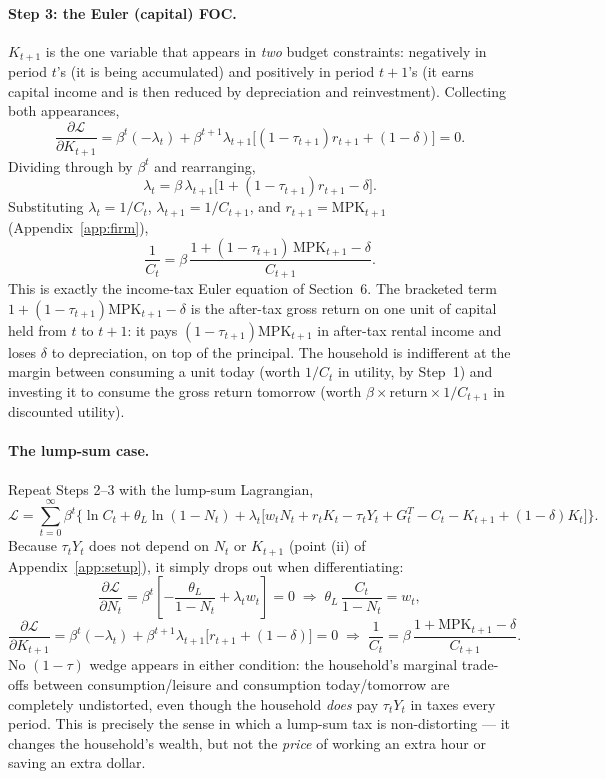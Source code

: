 \documentclass[11pt]{article}
\newcommand{\eq}[1]{\begin{equation}#1\end{equation}}
\begin{document}
\paragraph{Step 3: the Euler (capital) FOC.} $K_{t+1}$ is the one variable
that appears in \emph{two} budget constraints: negatively in period $t$'s
(it is being accumulated) and positively in period $t+1$'s (it earns
capital income and is then reduced by depreciation and reinvestment).
Collecting both appearances,
\eq{
\frac{\partial\mathcal{L}}{\partial K_{t+1}}
= \beta^t(-\lambda_t) + \beta^{t+1}\lambda_{t+1}\Big[(1-\tau_{t+1})r_{t+1}+(1-\delta)\Big] = 0.
}
Dividing through by $\beta^t$ and rearranging,
\eq{ \lambda_t = \beta\,\lambda_{t+1}\Big[1+(1-\tau_{t+1})r_{t+1}-\delta\Big]. }
Substituting $\lambda_t=1/C_t$, $\lambda_{t+1}=1/C_{t+1}$, and
$r_{t+1}=\mathrm{MPK}_{t+1}$ (Appendix~\ref{app:firm}),
\eq{ \boxed{\frac{1}{C_t} = \beta\,\frac{1+(1-\tau_{t+1})\,\mathrm{MPK}_{t+1}-\delta}{C_{t+1}}.} }
This is exactly the income-tax Euler equation of Section~6. The
bracketed term $1+(1-\tau_{t+1})\mathrm{MPK}_{t+1}-\delta$ is the
after-tax gross return on one unit of capital held from $t$ to $t+1$: it
pays $(1-\tau_{t+1})\mathrm{MPK}_{t+1}$ in after-tax rental income and
loses $\delta$ to depreciation, on top of the principal. The household is
indifferent at the margin between consuming a unit today (worth $1/C_t$ in
utility, by Step~1) and investing it to consume the gross return tomorrow
(worth $\beta\times\text{return}\times 1/C_{t+1}$ in discounted utility).

\paragraph{The lump-sum case.} Repeat Steps 2--3 with the lump-sum
Lagrangian,
\eq{
\mathcal{L} = \sum_{t=0}^{\infty}\beta^t\Big\{
  \ln C_t + \theta_L\ln(1-N_t)
  + \lambda_t\Big[w_tN_t+r_tK_t-\tau_tY_t+G^T_t-C_t-K_{t+1}+(1-\delta)K_t\Big]
\Big\}.
}
Because $\tau_tY_t$ does not depend on $N_t$ or $K_{t+1}$ (point (ii) of
Appendix~\ref{app:setup}), it simply drops out when differentiating:
\eq{
\frac{\partial\mathcal{L}}{\partial N_t}=\beta^t\left[-\frac{\theta_L}{1-N_t}+\lambda_tw_t\right]=0
\;\Longrightarrow\; \boxed{\theta_L\,\frac{C_t}{1-N_t}=w_t,}
}
\eq{
\frac{\partial\mathcal{L}}{\partial K_{t+1}}=\beta^t(-\lambda_t)+\beta^{t+1}\lambda_{t+1}\big[r_{t+1}+(1-\delta)\big]=0
\;\Longrightarrow\; \boxed{\frac{1}{C_t}=\beta\,\frac{1+\mathrm{MPK}_{t+1}-\delta}{C_{t+1}}.}
}
No $(1-\tau)$ wedge appears in either condition: the household's marginal
trade-offs between consumption/leisure and consumption today/tomorrow are
completely undistorted, even though the household \emph{does} pay
$\tau_tY_t$ in taxes every period. This is precisely the sense in which a
lump-sum tax is non-distorting --- it changes the household's wealth, but
not the \emph{price} of working an extra hour or saving an extra dollar.
\end{document}
